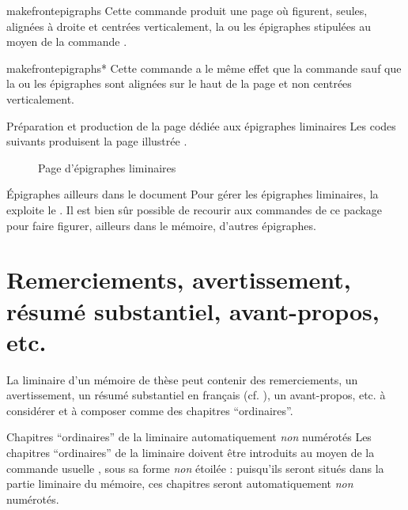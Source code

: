 \begin{docCommand}{makefrontepigraphs}{}
  Cette commande produit une page où figurent, seules, alignées à droite et
  centrées verticalement, la ou les épigraphes stipulées au moyen de la
  commande .
\end{docCommand}
%
\begin{docCommand}{makefrontepigraphs*}{}
  Cette commande a le même effet que la commande 
  sauf que la ou les épigraphes sont alignées sur le haut de la page et non
  centrées verticalement.
\end{docCommand}

\begin{dbexample}{Préparation et production de la page dédiée aux épigraphes
    liminaires}{}
  \NoAutoSpacing%
  Les codes suivants produisent la page illustrée .
\end{dbexample}

\begin{figure}[htbp]
  \centering
  \caption{Page d'épigraphes liminaires}
  \label{fig-epigraphspage}
\end{figure}

\begin{dbremark}{Épigraphes ailleurs dans le document}{}
  Pour gérer les épigraphes liminaires, la \yatCl{} exploite le
   . Il est bien sûr
  possible de recourir aux commandes de ce package pour faire figurer, ailleurs
  dans le mémoire, d'autres épigraphes.
\end{dbremark}

\section{Remerciements, avertissement, résumé substantiel, avant-propos, etc.}
%
%
%
%

La \gls{liminaire} d'un mémoire de thèse peut contenir des remerciements, un
avertissement, un résumé substantiel en français (cf. ),
un avant-propos, etc.  à considérer et à composer comme des chapitres
\enquote{ordinaires}.

\begin{dbwarning}{Chapitres \enquote{ordinaires} de la \gls{liminaire}
    automatiquement \emph{non} numérotés}{}
  Les chapitres \enquote{ordinaires} de la \gls{liminaire} doivent être
  introduits au moyen de la commande usuelle , sous sa
  forme \emph{non} étoilée : puisqu'ils seront situés dans la partie liminaire
  du mémoire, ces chapitres seront automatiquement \emph{non} numérotés.
\end{dbwarning}

